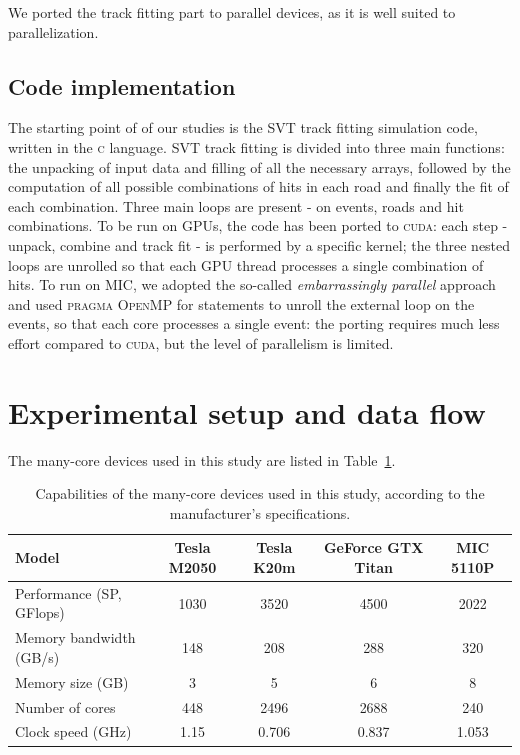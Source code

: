 \documentclass[letterpaper]{jpconf}
\begin{document}
We ported the track fitting part to parallel devices, as it is well suited to 
parallelization. 

\subsection{Code implementation}
The starting point of of our studies is the SVT track fitting
simulation code, written in the \textsc{c} language. SVT track fitting
is divided into three main functions: the unpacking of input data and
filling of all the necessary arrays, followed by the computation of
all possible combinations of hits in each road and finally the fit of
each combination. Three main loops are present - on events, roads and
hit combinations.  To be run on GPUs, the code has been ported to
\textsc{cuda}: each step - unpack, combine and track fit - is
performed by a specific kernel; the three nested loops are unrolled so
that each GPU thread processes a single combination of hits.  To run
on MIC, we adopted the so-called \textit{embarrassingly parallel}
approach and used \textsc{pragma OpenMP} for statements to unroll the external
loop on the events, so that each core processes a single event: the
porting requires much less effort compared to \textsc{cuda}, but the level of
parallelism is limited.

\section{Experimental setup and data flow}
The many-core devices used in this study are listed in Table~\ref{tab_hwspecs}.

\begin{table}[!t]
  \centering
  \begin{tabular}{|l|c|c|c|c|}
    \hline
    Model & Tesla M2050 & Tesla K20m & GeForce GTX  Titan & MIC 5110P \\
    \hline
    \hline
    Performance (SP, GFlops) & 1030 & 3520 & 4500 & 2022 \\
    Memory bandwidth  (GB/s) & 148 & 208 & 288  & 320\\   
    Memory size (GB) & 3 & 5 & 6 & 8 \\
    Number of cores & 448 & 2496 & 2688 & 240 \\
    Clock speed (GHz) & 1.15 & 0.706 & 0.837 & 1.053 \\
    \hline
  \end{tabular}
  \caption{Capabilities of the many-core devices used in this study, according to the manufacturer's specifications.}
  \label{tab_hwspecs}
\end{table}
\end{document}
